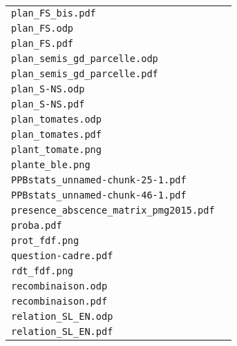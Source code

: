 \begin{center}
\begin{supertabular}{p{.8\textwidth}c}
\texttt{plan\_FS\_bis.pdf} & \cite{plan_FS} \\
\texttt{plan\_FS.odp} & \\
\texttt{plan\_FS.pdf} & \\ \hline

\texttt{plan\_semis\_gd\_parcelle.odp} & \cite{plan_semis_gd_parcelle} \\
\texttt{plan\_semis\_gd\_parcelle.pdf} & \\ \hline

\texttt{plan\_S-NS.odp} & \cite{plan_S-NS} \\
\texttt{plan\_S-NS.pdf} & \\ \hline

\texttt{plan\_tomates.odp} & \cite{plan_tomates} \\
\texttt{plan\_tomates.pdf} & \\ \hline

\texttt{plant\_tomate.png} & \cite{plant_tomate} \\ \hline

\texttt{plante\_ble.png} & \cite{plante_ble} \\ \hline

\texttt{PPBstats\_unnamed-chunk-25-1.pdf} & \cite{PPBstats_unnamed-chunk-25-1} \\ \hline

\texttt{PPBstats\_unnamed-chunk-46-1.pdf} & \cite{PPBstats_unnamed-chunk-46-1} \\ \hline

\texttt{presence\_abscence\_matrix\_pmg2015.pdf} & \cite{presence_abscence_matrix_pmg2015} \\ \hline

\texttt{proba.pdf} & \cite{proba} \\ \hline

\texttt{prot\_fdf.png} & \cite{prot_fdf} \\ \hline

\texttt{question-cadre.pdf} & \cite{question-cadre} \\ \hline

\texttt{rdt\_fdf.png} & \cite{rdt_fdf} \\ \hline

\texttt{recombinaison.odp} & \cite{recombinaison} \\
\texttt{recombinaison.pdf} & \\ \hline

\texttt{relation\_SL\_EN.odp} & \cite{relation_SL_EN} \\
\texttt{relation\_SL\_EN.pdf} & \\ \hline


\end{supertabular}
\end{center}
